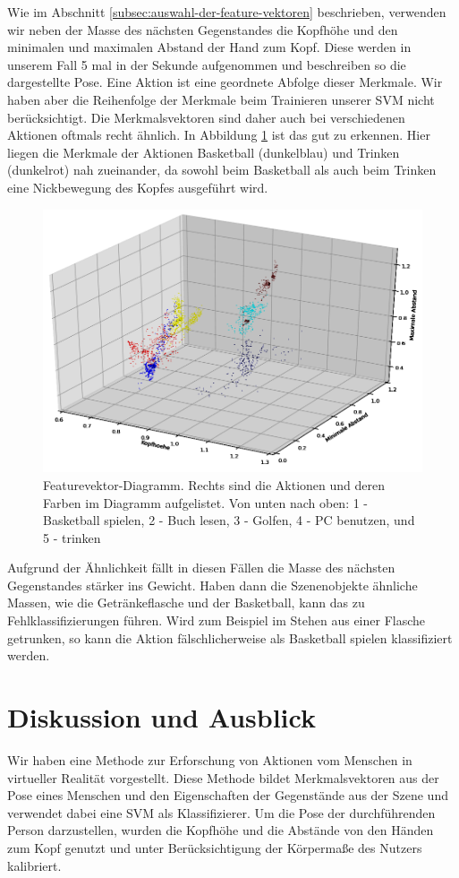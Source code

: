 Wie im Abschnitt \ref{subsec:auswahl-der-feature-vektoren} beschrieben, verwenden wir neben der Masse des nächsten Gegenstandes die Kopfhöhe und den minimalen und maximalen Abstand der Hand zum Kopf. Diese werden in unserem Fall 5 mal in der Sekunde aufgenommen und beschreiben so die dargestellte Pose. Eine Aktion ist eine geordnete Abfolge dieser Merkmale. Wir haben aber die Reihenfolge der Merkmale beim Trainieren unserer SVM nicht berücksichtigt. Die Merkmalsvektoren sind daher auch bei verschiedenen Aktionen oftmals recht ähnlich. In Abbildung \ref{fig:Merkmalvektoren-Diagramm} ist das gut zu erkennen. Hier liegen die Merkmale der Aktionen Basketball (dunkelblau) und Trinken (dunkelrot) nah zueinander, da sowohl beim Basketball als auch beim Trinken eine Nickbewegung des Kopfes ausgeführt wird.\newline
\begin{figure}[hbtp]
\includegraphics[width=1.0\linewidth]{moplot.png}
\caption{Featurevektor-Diagramm. Rechts sind die Aktionen und deren Farben im Diagramm aufgelistet. Von unten nach oben: 1 - Basketball spielen, 2 - Buch lesen, 3 - Golfen, 4 - PC benutzen, und 5 - trinken }
\label{fig:Merkmalvektoren-Diagramm}
\end{figure}
Aufgrund der Ähnlichkeit fällt in diesen Fällen die Masse des nächsten Gegenstandes stärker ins Gewicht. Haben dann die Szenenobjekte ähnliche Massen, wie die Getränkeflasche und der Basketball, kann das zu Fehlklassifizierungen führen. Wird zum Beispiel im Stehen aus einer Flasche getrunken, so kann die Aktion fälschlicherweise als \glqq{}Basketball spielen\grqq{} klassifiziert werden. 

\section{Diskussion und Ausblick}
\label{diskussion-ausblick}
Wir haben eine Methode zur Erforschung von Aktionen vom Menschen in virtueller Realität vorgestellt. Diese Methode bildet Merkmalsvektoren aus der Pose eines Menschen und den Eigenschaften der Gegenstände aus der Szene und verwendet dabei eine SVM als Klassifizierer. Um die Pose der durchführenden Person darzustellen, wurden die Kopfhöhe und die Abstände von den Händen zum Kopf genutzt und unter Berücksichtigung der Körpermaße des Nutzers kalibriert. 


